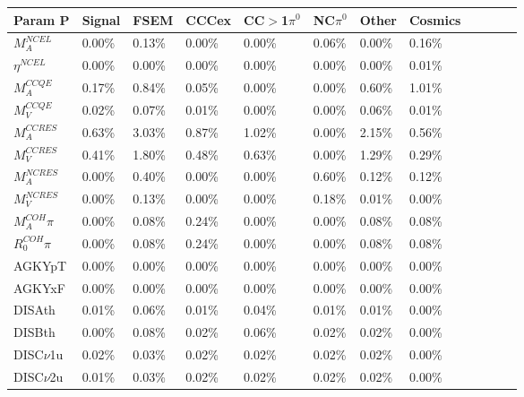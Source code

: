 \begin{table*}
\centering
{}
 \begin{tabular}{| l | l | l | l | l | l | l | l | l | l | l | l | }
 \hline
  Param P &Signal& FSEM & CCCex & CC$>$1$\pi^0$ & NC$\pi^0$& Other & Cosmics \\ [0.1ex] \hline
$M_A^{NCEL}$ & 0.00\% &  0.13\% &  0.00\% &  0.00\% &  0.06\% &  0.00\% &  0.16\%  \\
$\eta^{NCEL}$  & 0.00\% &  0.00\% &  0.00\% &  0.00\% &  0.00\% &  0.00\% &  0.01\% \\
$M_A^{CCQE}$  & 0.17\% &  0.84\% &  0.05\% &  0.00\% &  0.00\% &  0.60\% &  1.01\% \\
$M_V^{CCQE}$  & 0.02\% &  0.07\% &  0.01\% &  0.00\% &  0.00\% &  0.06\% &  0.01\% \\
$M_A^{CCRES}$  & 0.63\% &  3.03\% &  0.87\% &  1.02\% &  0.00\% &  2.15\% &  0.56\% \\
$M_V^{CCRES}$ & 0.41\% &  1.80\% &  0.48\% &  0.63\% &  0.00\% &  1.29\% &  0.29\% \\
$M_A^{NCRES}$ & 0.00\% &  0.40\% &  0.00\% &  0.00\% &  0.60\% &  0.12\% &  0.12\% \\
$M_V^{NCRES}$ & 0.00\% &  0.13\% &  0.00\% &  0.00\% &  0.18\% &  0.01\% &  0.00\%\\
$M_A^{COH}\pi$ & 0.00\% &  0.08\% &  0.24\% &  0.00\% &  0.00\% &  0.08\% &  0.08\%  \\
$R_0^{COH}\pi$ & 0.00\% &  0.08\% &  0.24\% &  0.00\% &  0.00\% &  0.08\% &  0.08\%  \\

AGKYpT & 0.00\% &  0.00\% &  0.00\% &  0.00\% &  0.00\% &  0.00\% &  0.00\% \\ %
AGKYxF & 0.00\% &  0.00\% &  0.00\% &  0.00\% &  0.00\% &  0.00\% &  0.00\% \\ %
DISAth & 0.01\% &  0.06\% &  0.01\% &  0.04\% &  0.01\% &  0.01\% &  0.00\% \\ %
DISBth & 0.00\% &  0.08\% &  0.02\% &  0.06\% &  0.02\% &  0.02\% &  0.00\% \\ %
DISC$\nu$1u & 0.02\% &  0.03\% &  0.02\% &  0.02\% &  0.02\% &  0.02\% &  0.00\%  \\ %
DISC$\nu$2u & 0.01\% &  0.03\% &  0.02\% &  0.02\% &  0.02\% &  0.02\% &  0.00\%  \\ \hline


\end{tabular}
\end{table*}
